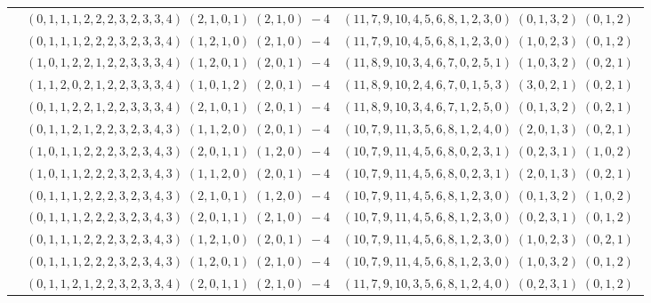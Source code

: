 \documentclass[11pt]{article}
\begin{document}
\begin{longtable}[l]{|c|c|c|}
 \cline{2-3} 
 & $(0 ,1 ,1 ,1 ,2 ,2 ,2 ,3 ,2 ,3 ,3 ,4) \;(2 ,1 ,0 ,1) \;(2 ,1 ,0) \;-4$ & $(11 ,7 ,9 ,10 ,4 ,5 ,6 ,8 ,1 ,2 ,3 ,0) \;(0 ,1 ,3 ,2) \;(0 ,1 ,2) \;$\\ 
 \cline{2-3} 
 & $(0 ,1 ,1 ,1 ,2 ,2 ,2 ,3 ,2 ,3 ,3 ,4) \;(1 ,2 ,1 ,0) \;(2 ,1 ,0) \;-4$ & $(11 ,7 ,9 ,10 ,4 ,5 ,6 ,8 ,1 ,2 ,3 ,0) \;(1 ,0 ,2 ,3) \;(0 ,1 ,2) \;$\\ 
 \cline{2-3} 
 & $(1 ,0 ,1 ,2 ,2 ,1 ,2 ,2 ,3 ,3 ,3 ,4) \;(1 ,2 ,0 ,1) \;(2 ,0 ,1) \;-4$ & $(11 ,8 ,9 ,10 ,3 ,4 ,6 ,7 ,0 ,2 ,5 ,1) \;(1 ,0 ,3 ,2) \;(0 ,2 ,1) \;$\\ 
 \cline{2-3} 
 & $(1 ,1 ,2 ,0 ,2 ,1 ,2 ,2 ,3 ,3 ,3 ,4) \;(1 ,0 ,1 ,2) \;(2 ,0 ,1) \;-4$ & $(11 ,8 ,9 ,10 ,2 ,4 ,6 ,7 ,0 ,1 ,5 ,3) \;(3 ,0 ,2 ,1) \;(0 ,2 ,1) \;$\\ 
 \cline{2-3} 
 & $(0 ,1 ,1 ,2 ,2 ,1 ,2 ,2 ,3 ,3 ,3 ,4) \;(2 ,1 ,0 ,1) \;(2 ,0 ,1) \;-4$ & $(11 ,8 ,9 ,10 ,3 ,4 ,6 ,7 ,1 ,2 ,5 ,0) \;(0 ,1 ,3 ,2) \;(0 ,2 ,1) \;$\\ 
 \cline{2-3} 
 & $(0 ,1 ,1 ,2 ,1 ,2 ,2 ,3 ,2 ,3 ,4 ,3) \;(1 ,1 ,2 ,0) \;(2 ,0 ,1) \;-4$ & $(10 ,7 ,9 ,11 ,3 ,5 ,6 ,8 ,1 ,2 ,4 ,0) \;(2 ,0 ,1 ,3) \;(0 ,2 ,1) \;$\\ 
 \cline{2-3} 
 & $(1 ,0 ,1 ,1 ,2 ,2 ,2 ,3 ,2 ,3 ,4 ,3) \;(2 ,0 ,1 ,1) \;(1 ,2 ,0) \;-4$ & $(10 ,7 ,9 ,11 ,4 ,5 ,6 ,8 ,0 ,2 ,3 ,1) \;(0 ,2 ,3 ,1) \;(1 ,0 ,2) \;$\\ 
 \cline{2-3} 
 & $(1 ,0 ,1 ,1 ,2 ,2 ,2 ,3 ,2 ,3 ,4 ,3) \;(1 ,1 ,2 ,0) \;(2 ,0 ,1) \;-4$ & $(10 ,7 ,9 ,11 ,4 ,5 ,6 ,8 ,0 ,2 ,3 ,1) \;(2 ,0 ,1 ,3) \;(0 ,2 ,1) \;$\\ 
 \cline{2-3} 
 & $(0 ,1 ,1 ,1 ,2 ,2 ,2 ,3 ,2 ,3 ,4 ,3) \;(2 ,1 ,0 ,1) \;(1 ,2 ,0) \;-4$ & $(10 ,7 ,9 ,11 ,4 ,5 ,6 ,8 ,1 ,2 ,3 ,0) \;(0 ,1 ,3 ,2) \;(1 ,0 ,2) \;$\\ 
 \cline{2-3} 
 & $(0 ,1 ,1 ,1 ,2 ,2 ,2 ,3 ,2 ,3 ,4 ,3) \;(2 ,0 ,1 ,1) \;(2 ,1 ,0) \;-4$ & $(10 ,7 ,9 ,11 ,4 ,5 ,6 ,8 ,1 ,2 ,3 ,0) \;(0 ,2 ,3 ,1) \;(0 ,1 ,2) \;$\\ 
 \cline{2-3} 
 & $(0 ,1 ,1 ,1 ,2 ,2 ,2 ,3 ,2 ,3 ,4 ,3) \;(1 ,2 ,1 ,0) \;(2 ,0 ,1) \;-4$ & $(10 ,7 ,9 ,11 ,4 ,5 ,6 ,8 ,1 ,2 ,3 ,0) \;(1 ,0 ,2 ,3) \;(0 ,2 ,1) \;$\\ 
 \cline{2-3} 
 & $(0 ,1 ,1 ,1 ,2 ,2 ,2 ,3 ,2 ,3 ,4 ,3) \;(1 ,2 ,0 ,1) \;(2 ,1 ,0) \;-4$ & $(10 ,7 ,9 ,11 ,4 ,5 ,6 ,8 ,1 ,2 ,3 ,0) \;(1 ,0 ,3 ,2) \;(0 ,1 ,2) \;$\\ 
 \cline{2-3} 
 & $(0 ,1 ,1 ,2 ,1 ,2 ,2 ,3 ,2 ,3 ,3 ,4) \;(2 ,0 ,1 ,1) \;(2 ,1 ,0) \;-4$ & $(11 ,7 ,9 ,10 ,3 ,5 ,6 ,8 ,1 ,2 ,4 ,0) \;(0 ,2 ,3 ,1) \;(0 ,1 ,2) \;$\\ 

\end{longtable}
\end{document}
